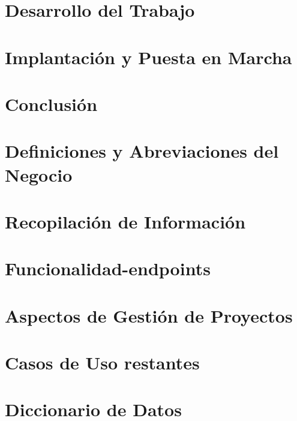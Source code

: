 \documentclass[final,letterpaper,oneside,authoryear,11pt,singlespace,spanish]{ezthesis}
\begin{document}
\chapter{Desarrollo del Trabajo}
\label{cap:desarrollo}


\chapter{Implantación y Puesta en Marcha}
\label{cap:implantacion}


\chapter{Conclusión}
\label{cap:conclusion}




\appendix

\chapter{Definiciones y Abreviaciones del Negocio}\label{anexo:glosario}


\chapter{Recopilación de Información}\label{anexo:recopilacion}


\chapter{Funcionalidad-endpoints}\label{anexo:endpoints}


\chapter{Aspectos de Gestión de Proyectos}\label{anexo:gestion}


\chapter{Casos de Uso restantes}\label{anexo:casos-restantes}


\chapter{Diccionario de Datos}\label{anexo:diccionario}

\end{document}
